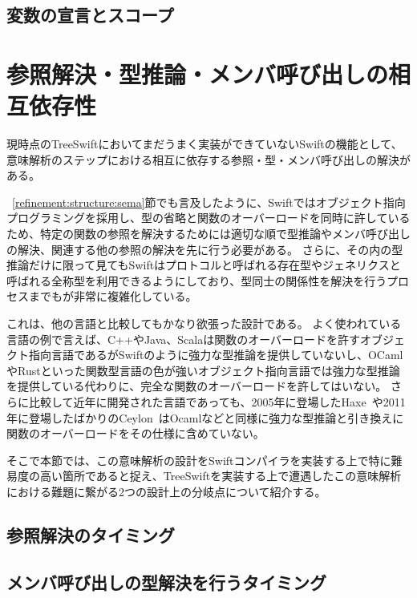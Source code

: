 \subsection{変数の宣言とスコープ}


\section{参照解決・型推論・メンバ呼び出しの相互依存性}

現時点のTreeSwiftにおいてまだうまく実装ができていないSwiftの機能として、意味解析のステップにおける相互に依存する参照・型・メンバ呼び出しの解決がある。

~\ref{refinement:structure:sema}節でも言及したように、Swiftではオブジェクト指向プログラミングを採用し、型の省略と関数のオーバーロードを同時に許しているため、特定の関数の参照を解決するためには適切な順で型推論やメンバ呼び出しの解決、関連する他の参照の解決を先に行う必要がある。
さらに、その内の型推論だけに限って見てもSwiftはプロトコルと呼ばれる存在型やジェネリクスと呼ばれる全称型を利用できるようにしており、型同士の関係性を解決を行うプロセスまでもが非常に複雑化している。

これは、他の言語と比較してもかなり欲張った設計である。
よく使われている言語の例で言えば、C++やJava、Scalaは関数のオーバーロードを許すオブジェクト指向言語であるがSwiftのように強力な型推論を提供していないし、OCamlやRustといった関数型言語の色が強いオブジェクト指向言語では強力な型推論を提供している代わりに、完全な関数のオーバーロードを許してはいない。
さらに比較して近年に開発された言語であっても、2005年に登場したHaxe~\cite{haxe-overload}や2011年に登場したばかりのCeylon~\cite{ceylon-overload}はOcamlなどと同様に強力な型推論と引き換えに関数のオーバーロードをその仕様に含めていない。

そこで本節では、この意味解析の設計をSwiftコンパイラを実装する上で特に難易度の高い箇所であると捉え、TreeSwiftを実装する上で遭遇したこの意味解析における難題に繋がる2つの設計上の分岐点について紹介する。

\subsection{参照解決のタイミング}

\subsection{メンバ呼び出しの型解決を行うタイミング}
